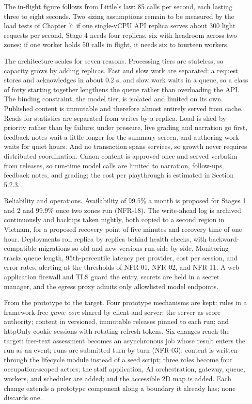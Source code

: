 The in-flight figure follows from Little's law: 85 calls per second, each lasting three to eight seconds. Two sizing assumptions remain to be measured by the load tests of Chapter 7: if one single-vCPU API replica serves about 300 light requests per second, Stage 4 needs four replicas, six with headroom across two zones; if one worker holds 50 calls in flight, it needs six to fourteen workers.

The architecture scales for seven reasons. Processing tiers are stateless, so capacity grows by adding replicas. Fast and slow work are separated: a request stores and acknowledges in about 0.2 s, and slow work waits in a queue, so a class of forty starting together lengthens the queue rather than overloading the API. The binding constraint, the model tier, is isolated and limited on its own. Published content is immutable and therefore almost entirely served from cache. Reads for statistics are separated from writes by a replica. Load is shed by priority rather than by failure: under pressure, live grading and narration go first, feedback notes wait a little longer for the summary screen, and authoring work waits for quiet hours. And no transaction spans services, so growth never requires distributed coordination. Canon content is approved once and served verbatim from releases, so run-time model calls are limited to narration, follow-ups, feedback notes, and grading; the cost per playthrough is estimated in Section 5.2.3.

Reliability and operations. Availability of 99.5\% a month is proposed for Stages 1 and 2 and 99.9\% once two zones run (NFR-18). The write-ahead log is archived continuously and backups taken nightly, both copied to a second region in Vietnam, for a proposed recovery point of five minutes and recovery time of one hour. Deployments roll replica by replica behind health checks, with backward-compatible migrations so old and new versions run side by side. Monitoring tracks queue length, 95th-percentile latency per provider, cost per session, and error rates, alerting at the thresholds of NFR-01, NFR-02, and NFR-11. A web application firewall and TLS guard the entry, secrets are held in a secret manager, and the egress proxy admits only allowlisted model endpoints.

From the prototype to the target. Four prototype mechanisms are kept: rules in a framework-free \textit{game-core} shared by client and server; the server as score authority; content in versioned, immutable releases pinned to each run; and httpOnly cookie sessions with rotating refresh tokens. Six changes reach the target: free-text assessment becomes an asynchronous job whose result enters the run as an event; runs are submitted turn by turn (NFR-03); content is written through the lifecycle module instead of a seed script; three roles become four occupation-scoped actors; the staff application, AI orchestration, gateway, queue, workers, and scheduler are added; and the accessible 2D map is added. Each change extends a prototype component along a boundary it already has; none discards one.
